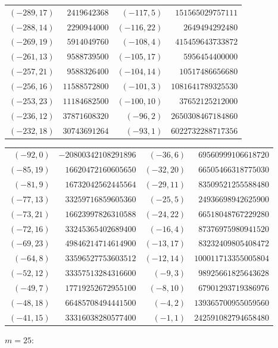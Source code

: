 {\begin{tabular}{@{}r@{\ \ }r@{\qquad}r@{\ \ }r@{}}
$(-289,17)$ & $2419642368$ & $(-117,5)$ & $151565029757111$ \\
$(-288,14)$ & $2290944000$ & $(-116,22)$ & $2649494292480$ \\
$(-269,19)$ & $5914049760$ & $(-108,4)$ & $415459643733872$ \\
$(-261,13)$ & $9588739500$ & $(-105,17)$ & $5956454400000$ \\
$(-257,21)$ & $9588326400$ & $(-104,14)$ & $10517486656680$ \\
$(-256,16)$ & $11588572800$ & $(-101,3)$ & $1081641789325530$ \\
$(-253,23)$ & $11184682500$ & $(-100,10)$ & $37652125212000$ \\
$(-236,12)$ & $37871608320$ & $(-96,2)$ & $2650308467184860$ \\
$(-232,18)$ & $30743691264$ & $(-93,1)$ & $6022732288717356$ \\
\end{tabular}}\par
{\scriptsize\begin{tabular}{@{}r@{\ \ }r@{\qquad}r@{\ \ }r@{}}
$(-92,0)$ & $-20800342108291896$ & $(-36,6)$ & $69560999106618720$ \\
$(-85,19)$ & $16620472160605650$ & $(-32,20)$ & $66505466318775030$ \\
$(-81,9)$ & $16732042562445564$ & $(-29,11)$ & $83509521255588480$ \\
$(-77,13)$ & $33259716859605360$ & $(-25,5)$ & $24936698942625900$ \\
$(-73,21)$ & $16623997826310588$ & $(-24,22)$ & $66518048767229280$ \\
$(-72,16)$ & $33245365402689400$ & $(-16,4)$ & $87376975980941520$ \\
$(-69,23)$ & $49846214714614900$ & $(-13,17)$ & $83232409805408472$ \\
$(-64,8)$ & $33596527753603512$ & $(-12,14)$ & $100011713355005804$ \\
$(-52,12)$ & $33357513284316600$ & $(-9,3)$ & $98925661825643628$ \\
$(-49,7)$ & $17719252672955100$ & $(-8,10)$ & $67901293719386976$ \\
$(-48,18)$ & $66485708494441500$ & $(-4,2)$ & $139365700955059560$ \\
$(-41,15)$ & $33316038280577400$ & $(-1,1)$ & $242591082794658480$ \\
\end{tabular}}\par\medskip
\noindent$m=25$:\nopagebreak\\[2pt]
